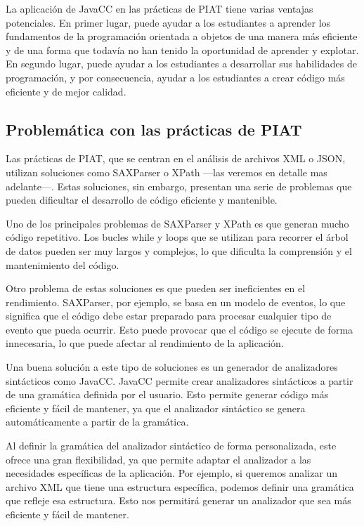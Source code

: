 La aplicación de JavaCC en las prácticas de PIAT tiene varias ventajas potenciales. En primer lugar, puede ayudar a los estudiantes a aprender los fundamentos de la programación orientada a objetos de una manera más eficiente y de una forma que todavía no han tenido la oportunidad de aprender y explotar. En segundo lugar, puede ayudar a los estudiantes a desarrollar sus habilidades de programación, y por consecuencia, ayudar a los estudiantes a crear código más eficiente y de mejor calidad.
\subsection{Problemática con las prácticas de PIAT}

\noindent Las prácticas de PIAT, que se centran en el análisis de archivos XML o JSON,  utilizan soluciones como SAXParser o XPath ---las veremos en detalle mas adelante---. Estas soluciones, sin embargo, presentan una serie de problemas que pueden dificultar el desarrollo de código eficiente y mantenible.

Uno de los principales problemas de SAXParser y XPath es que generan mucho código repetitivo. Los bucles while y loops que se utilizan para recorrer el árbol de datos pueden ser muy largos y complejos, lo que dificulta la comprensión y el mantenimiento del código.

Otro problema de estas soluciones es que pueden ser ineficientes en el rendimiento. SAXParser, por ejemplo, se basa en un modelo de eventos, lo que significa que el código debe estar preparado para procesar cualquier tipo de evento que pueda ocurrir. Esto puede provocar que el código se ejecute de forma innecesaria, lo que puede afectar al rendimiento de la aplicación.

Una buena solución a este tipo de soluciones es un generador de analizadores sintácticos como JavaCC. JavaCC permite crear analizadores sintácticos a partir de una gramática definida por el usuario. Esto permite generar código más eficiente y fácil de mantener, ya que el analizador sintáctico se genera automáticamente a partir de la gramática.

Al definir la gramática del analizador sintáctico de forma personalizada, este ofrece una gran flexibilidad, ya que permite adaptar el analizador a las necesidades específicas de la aplicación. Por ejemplo, si queremos analizar un archivo XML que tiene una estructura específica, podemos definir una gramática que refleje esa estructura. Esto nos permitirá generar un analizador que sea más eficiente y fácil de mantener.

